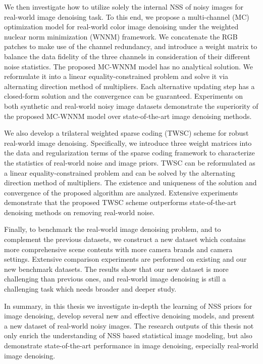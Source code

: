 \documentclass[12pt,oneside]{report}
\numberwithin{figure}{chapter}
\newenvironment{preliminary}%
{\pagestyle{plain}\pagenumbering{roman}}%
{\pagenumbering{arabic}}
\begin{document}
\begin{preliminary}
We then investigate how to utilize solely the internal NSS of noisy images for real-world image denoising task. To this end, we propose a multi-channel (MC) optimization model for real-world color image denoising under the weighted nuclear norm minimization (WNNM) framework. We concatenate the RGB patches to make use of the channel redundancy, and introduce a weight matrix to balance the data fidelity of the three channels in consideration of their different noise statistics. The proposed MC-WNNM model has no analytical solution. We reformulate it into a linear equality-constrained problem and solve it via alternating direction method of multipliers. Each alternative updating step has a closed-form solution and the convergence can be guaranteed. Experiments on both synthetic and real-world noisy image datasets demonstrate the superiority of the proposed MC-WNNM model over state-of-the-art image denoising methods.

We also develop a trilateral weighted sparse coding (TWSC) scheme for robust real-world image denoising. Specifically, we introduce three weight matrices into the data and regularization terms of the sparse coding framework to characterize the statistics of real-world noise and image priors. TWSC can be reformulated as a linear equality-constrained problem and can be solved by the alternating direction method of multipliers. The existence and uniqueness of the solution and convergence of the proposed algorithm are analyzed. Extensive experiments demonstrate that the proposed TWSC scheme outperforms state-of-the-art denoising methods on removing real-world noise.

Finally, to benchmark the real-world image denoising problem, and to complement the previous datasets, we construct a new dataset which contains more comprehensive scene contents with more camera brands and camera settings. Extensive comparison experiments are performed on existing and our new benchmark datasets. The results show that our new dataset is more challenging than previous ones, and real-world image denoising is still a challenging task which needs broader and deeper study.

In summary, in this thesis we investigate in-depth the learning of NSS priors for image denoising, develop several new and effective denoising models, and present a new dataset of real-world noisy images. The research outputs of this thesis not only enrich the understanding of NSS based statistical image modeling, but also demonstrate state-of-the-art performance in image denoising, especially real-world image denoising.



\end{preliminary}
\end{document}
